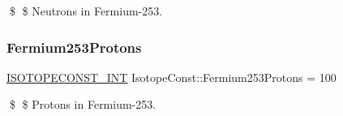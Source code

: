 \$ \$ Neutrons in Fermium-\/253. \mbox{\label{group___isotope_const-_fermium-_fm253_gaffb24839d14b796b6fb7da4e991ece44}} 
\subsubsection{\texorpdfstring{Fermium253\+Protons}{Fermium253Protons}}
{\footnotesize\ttfamily \mbox{\hyperlink{group___isotope_const-_macros_ga5f18360b3e99483a35c32d789e62621c}{I\+S\+O\+T\+O\+P\+E\+C\+O\+N\+S\+T\+\_\+\+I\+NT}} Isotope\+Const\+::\+Fermium253\+Protons = 100}

\$ \$ Protons in Fermium-\/253. 